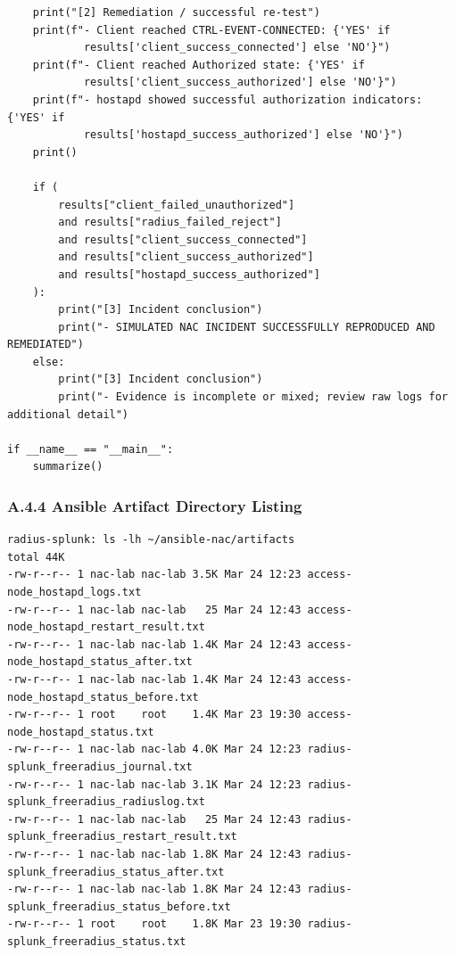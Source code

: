 \documentclass[11pt]{article}
\begin{document}
\begin{verbatim}
    print("[2] Remediation / successful re-test")
    print(f"- Client reached CTRL-EVENT-CONNECTED: {'YES' if 
            results['client_success_connected'] else 'NO'}")
    print(f"- Client reached Authorized state: {'YES' if 
            results['client_success_authorized'] else 'NO'}")
    print(f"- hostapd showed successful authorization indicators: {'YES' if 
            results['hostapd_success_authorized'] else 'NO'}")
    print()

    if (
        results["client_failed_unauthorized"]
        and results["radius_failed_reject"]
        and results["client_success_connected"]
        and results["client_success_authorized"]
        and results["hostapd_success_authorized"]
    ):
        print("[3] Incident conclusion")
        print("- SIMULATED NAC INCIDENT SUCCESSFULLY REPRODUCED AND REMEDIATED")
    else:
        print("[3] Incident conclusion")
        print("- Evidence is incomplete or mixed; review raw logs for additional detail")

if __name__ == "__main__":
    summarize()
\end{verbatim}


\subsubsection{A.4.4 Ansible Artifact Directory Listing}
\label{sec:appendix-a-ansible-artifact-directory-listing}

\begin{verbatim}
radius-splunk: ls -lh ~/ansible-nac/artifacts
total 44K
-rw-r--r-- 1 nac-lab nac-lab 3.5K Mar 24 12:23 access-node_hostapd_logs.txt
-rw-r--r-- 1 nac-lab nac-lab   25 Mar 24 12:43 access-node_hostapd_restart_result.txt
-rw-r--r-- 1 nac-lab nac-lab 1.4K Mar 24 12:43 access-node_hostapd_status_after.txt
-rw-r--r-- 1 nac-lab nac-lab 1.4K Mar 24 12:43 access-node_hostapd_status_before.txt
-rw-r--r-- 1 root    root    1.4K Mar 23 19:30 access-node_hostapd_status.txt
-rw-r--r-- 1 nac-lab nac-lab 4.0K Mar 24 12:23 radius-splunk_freeradius_journal.txt
-rw-r--r-- 1 nac-lab nac-lab 3.1K Mar 24 12:23 radius-splunk_freeradius_radiuslog.txt
-rw-r--r-- 1 nac-lab nac-lab   25 Mar 24 12:43 radius-splunk_freeradius_restart_result.txt
-rw-r--r-- 1 nac-lab nac-lab 1.8K Mar 24 12:43 radius-splunk_freeradius_status_after.txt
-rw-r--r-- 1 nac-lab nac-lab 1.8K Mar 24 12:43 radius-splunk_freeradius_status_before.txt
-rw-r--r-- 1 root    root    1.8K Mar 23 19:30 radius-splunk_freeradius_status.txt
\end{verbatim}
\end{document}
